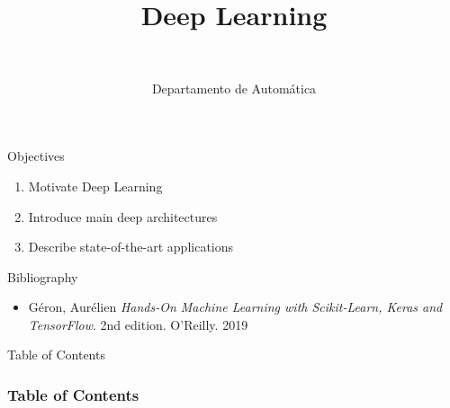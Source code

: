 \documentclass[10pt,compress]{beamer} %
\title[Deep Learning]{Deep Learning}
\author{\asignatura\\\carrera}
\institute{}
\date{Departamento de Automática}
\begin{document}
{\titlepageBlue
    \begin{frame}
        \titlepage
    \end{frame}
}

\institute{\asignatura}

\begin{frame}[plain]{}
   \begin{block}{Objectives}
      \begin{enumerate}
         \item Motivate Deep Learning
		 \item Introduce main deep architectures
         \item Describe state-of-the-art applications
      \end{enumerate} 
   \end{block}

   \begin{block}{Bibliography}
	\begin{itemize}
        \item Géron, Aurélien \textit{Hands-On Machine Learning with Scikit-Learn, Keras and TensorFlow}. 2nd edition. O'Reilly. 2019
	\end{itemize}
   \end{block}
\end{frame}

{
\begin{frame}[shrink]{Table of Contents}

 	\frametitle{Table of Contents}
  	\begin{multicols}{2}
  		\tableofcontents
    \end{multicols}

\end{frame}
}

\end{document}
